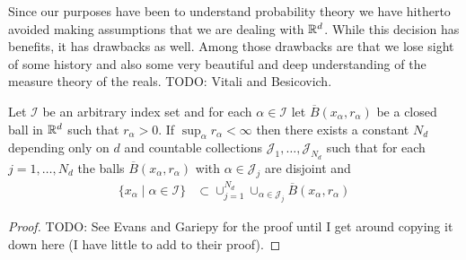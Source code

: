 Since our purposes have been to understand probability theory we have
hitherto avoided making assumptions that we are dealing with
$\mathbb{R}^d$.  While this decision has benefits, it has drawbacks as
well.  Among those drawbacks are that we lose sight of some history and also some very
beautiful and deep understanding of the measure theory of the reals.
TODO: Vitali and Besicovich.

\begin{thm}\label{BesicovichCoveringTheorem}
Let $\mathcal{I}$ be an arbitrary index set and for each $\alpha \in \mathcal{I}$ let $\overline{B}(x_\alpha, r_\alpha)$ be a closed
ball in $\mathbb{R}^d$ such that $r_\alpha > 0$.  If $\sup_{\alpha} r_\alpha < \infty$ then there exists a
constant $N_d$ depending only on $d$ and countable collections $\mathcal{J}_1, \dotsc, \mathcal{J}_{N_d}$ such
that for each $j=1, \dotsc, N_d$ the balls $\overline{B}(x_\alpha, r_\alpha)$ with $\alpha \in \mathcal{J}_j$ are disjoint and
\begin{align*}
\lbrace x_\alpha \mid \alpha \in \mathcal{I} \rbrace &\subset \cup_{j=1}^{N_d} \cup_{\alpha \in \mathcal{J}_j} \overline{B}(x_\alpha, r_\alpha)
\end{align*}
\end{thm}
\begin{proof}
TODO:
See Evans and Gariepy for the proof until I get around copying it down here (I have little to add to their proof).
\end{proof}

